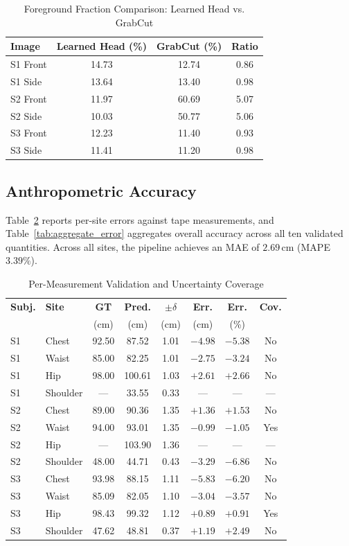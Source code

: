 \documentclass[journal]{IEEEtran}
\begin{document}
\begin{table}[!t]
\caption{Foreground Fraction Comparison: Learned Head vs. GrabCut}
\label{tab:segmenter_comp}
\centering
\begin{tabular}{lccc}
\toprule
\textbf{Image} & \textbf{Learned Head (\%)} & \textbf{GrabCut (\%)} & \textbf{Ratio} \\
\midrule
S1 Front & 14.73 & 12.74 & 0.86 \\
S1 Side & 13.64 & 13.40 & 0.98 \\
S2 Front & 11.97 & 60.69 & 5.07 \\
S2 Side & 10.03 & 50.77 & 5.06 \\
S3 Front & 12.23 & 11.40 & 0.93 \\
S3 Side & 11.41 & 11.20 & 0.98 \\
\bottomrule
\end{tabular}
\end{table}

\subsection{Anthropometric Accuracy}
Table~\ref{tab:per_measurement} reports per-site errors against tape measurements, and Table~\ref{tab:aggregate_error} aggregates overall accuracy across all ten validated quantities. Across all sites, the pipeline achieves an MAE of $2.69$\,cm (MAPE $3.39\%$).

\begin{table}[!t]
\caption{Per-Measurement Validation and Uncertainty Coverage}
\label{tab:per_measurement}
\centering
\begin{tabular}{llcccccc}
\toprule
\textbf{Subj.} & \textbf{Site} & \textbf{GT} & \textbf{Pred.} & $\pm\delta$ & \textbf{Err.} & \textbf{Err.} & \textbf{Cov.} \\
& & (cm) & (cm) & (cm) & (cm) & (\%) & \\
\midrule
S1 & Chest & 92.50 & 87.52 & 1.01 & $-4.98$ & $-5.38$ & No \\
S1 & Waist & 85.00 & 82.25 & 1.01 & $-2.75$ & $-3.24$ & No \\
S1 & Hip & 98.00 & 100.61 & 1.03 & $+2.61$ & $+2.66$ & No \\
S1 & Shoulder & --- & 33.55 & 0.33 & --- & --- & --- \\
\midrule
S2 & Chest & 89.00 & 90.36 & 1.35 & $+1.36$ & $+1.53$ & No \\
S2 & Waist & 94.00 & 93.01 & 1.35 & $-0.99$ & $-1.05$ & Yes \\
S2 & Hip & --- & 103.90 & 1.36 & --- & --- & --- \\
S2 & Shoulder & 48.00 & 44.71 & 0.43 & $-3.29$ & $-6.86$ & No \\
\midrule
S3 & Chest & 93.98 & 88.15 & 1.11 & $-5.83$ & $-6.20$ & No \\
S3 & Waist & 85.09 & 82.05 & 1.10 & $-3.04$ & $-3.57$ & No \\
S3 & Hip & 98.43 & 99.32 & 1.12 & $+0.89$ & $+0.91$ & Yes \\
S3 & Shoulder & 47.62 & 48.81 & 0.37 & $+1.19$ & $+2.49$ & No \\
\bottomrule
\end{tabular}
\end{table}
\end{document}

